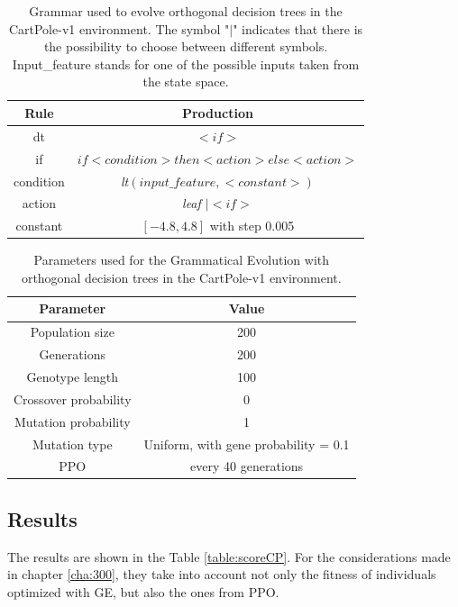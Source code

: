 \captionsetup{margin=2cm}
\begin{table}[h!]
\begin{center}
\begin{tabular}{ |c|c| }
\hline
\textbf{Rule} & \textbf{Production} \\
\hline
dt & \textit{$< if >$}\\
if & \textit{$if < condition > then < action > else < action >$}\\
condition & \textit{lt$(input\_feature,<constant>)$}\\
action & \textit{leaf $| < if >$}\\
constant & $[-4.8, 4.8]$ with step 0.005\\
\hline
\end{tabular}
\caption{Grammar used to evolve orthogonal decision trees in the CartPole-v1 environment. The symbol "$|$" indicates that there is the possibility to choose between different symbols. Input\_feature stands for one of the possible inputs taken from the state space.}
\label{table:1}
\end{center}
\end{table}


\begin{table}[h!]
\begin{center}
\begin{tabular}{ |c|c| } 
\hline
\textbf{Parameter} & \textbf{Value} \\
\hline
Population size & 200\\
Generations & 200\\
Genotype length & 100\\
Crossover probability & 0\\
Mutation probability & 1\\
Mutation type & Uniform, with gene probability = 0.1\\
PPO & every 40 generations\\
\hline
\end{tabular}
\caption{Parameters used for the Grammatical Evolution with orthogonal decision trees in the CartPole-v1 environment.}
\label{table:2}
\end{center}
\end{table}


\subsection{Results}
\label{subsec:413}
The results are shown in the Table \ref{table:scoreCP}. For the considerations made in chapter \ref{cha:300}, they take into account not only the fitness of individuals optimized with GE, but also the ones from PPO.

